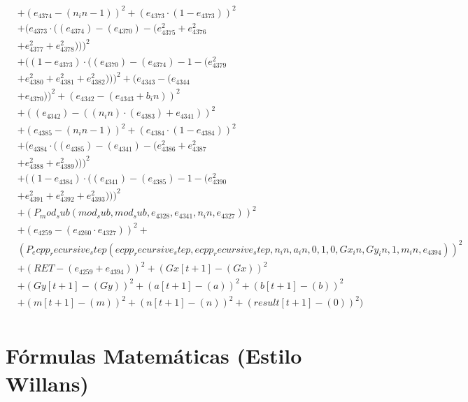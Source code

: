 \documentclass[10pt, a4paper]{article}
\begin{document}
\begin{small}
\begin{align*}
& + (e_{4374} - (n_in - 1))^{2} + (e_{4373}  \cdot  (1 - e_{4373}))^{2} \\
& + (e_{4373}  \cdot  ((e_{4374}) - (e_{4370}) - (e_{4375}^{2} + e_{4376}^{2} \\
& + e_{4377}^{2} + e_{4378}^{2})))^{2} \\
& + ((1 - e_{4373})  \cdot  ((e_{4370}) - (e_{4374}) - 1 - (e_{4379}^{2} \\
& + e_{4380}^{2} + e_{4381}^{2} + e_{4382}^{2})))^{2} + (e_{4343} - (e_{4344} \\
& + e_{4370}))^{2} + (e_{4342} - (e_{4343} + b_in))^{2} \\
& + ((e_{4342}) - ((n_in)  \cdot  (e_{4383}) + e_{4341}))^{2} \\
& + (e_{4385} - (n_in - 1))^{2} + (e_{4384}  \cdot  (1 - e_{4384}))^{2} \\
& + (e_{4384}  \cdot  ((e_{4385}) - (e_{4341}) - (e_{4386}^{2} + e_{4387}^{2} \\
& + e_{4388}^{2} + e_{4389}^{2})))^{2} \\
& + ((1 - e_{4384})  \cdot  ((e_{4341}) - (e_{4385}) - 1 - (e_{4390}^{2} \\
& + e_{4391}^{2} + e_{4392}^{2} + e_{4393}^{2})))^{2} \\
& + (P_mod_sub(mod_sub, mod_sub, e_{4328}, e_{4341}, n_in, e_{4327}))^{2} \\
& + (e_{4259} - (e_{4260}  \cdot  e_{4327}))^{2} + \\
& (P_ecpp_recursive_step(ecpp_recursive_step, ecpp_recursive_step, n_in, a_in, 0, 1, 0, Gx_in, Gy_in, 1, m_in, e_{4394}))^{2} \\
& + (RET - (e_{4259} + e_{4394}))^{2} + (Gx[t+1] - (Gx))^{2} \\
& + (Gy[t+1] - (Gy))^{2} + (a[t+1] - (a))^{2} + (b[t+1] - (b))^{2} \\
& + (m[t+1] - (m))^{2} + (n[t+1] - (n))^{2} + (result[t+1] - (0))^{2}) \\
\end{align*}
\end{small}\part{Fórmulas Matemáticas (Estilo Willans)}
\end{document}
